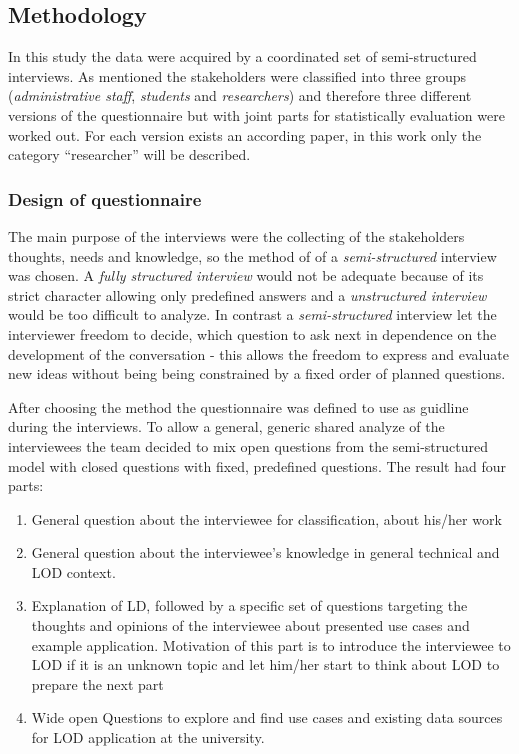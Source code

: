 \subsection{Methodology}\label{subsection:methodology}
In this study the data were acquired by a coordinated set of semi-structured interviews. As mentioned the stakeholders were classified into three groups (\textit{administrative staff}, \textit{students} and \textit{researchers}) and therefore three different versions of the questionnaire but with joint parts for statistically evaluation were worked out. For each version exists an according paper, in this work only the category ``researcher'' will be described.

\subsubsection{Design of questionnaire}
The main purpose of the interviews were the collecting of the stakeholders thoughts, needs and knowledge, so the method of of a \textit{semi-structured} interview was chosen. A \textit{fully structured interview} would not be adequate because of its strict character allowing only predefined answers and a \textit{unstructured interview} would be too difficult to analyze. In contrast a \textit{semi-structured} interview let the interviewer freedom to decide, which question to ask next in dependence on the development of the conversation - this allows the freedom to express and evaluate new ideas without being being constrained by a
fixed order of planned questions.

After choosing the method the questionnaire was defined to use as guidline during the interviews. To allow a general, generic shared analyze of the interviewees the team decided to mix open questions from the semi-structured model with closed questions with fixed, predefined questions. The result had four parts:

\begin{enumerate}
	\item General question about the interviewee for classification, about his/her work
	\item General question about the interviewee's knowledge in general technical and LOD context.
	\item Explanation of LD, followed by a specific set of questions targeting the thoughts and opinions of the interviewee about presented use cases and example application. Motivation of this part is to introduce the interviewee to LOD if it is an unknown topic and let him/her start to think about LOD to prepare the next part
	\item Wide open Questions to explore and find use cases and existing data sources for LOD application at the university.
\end{enumerate}

